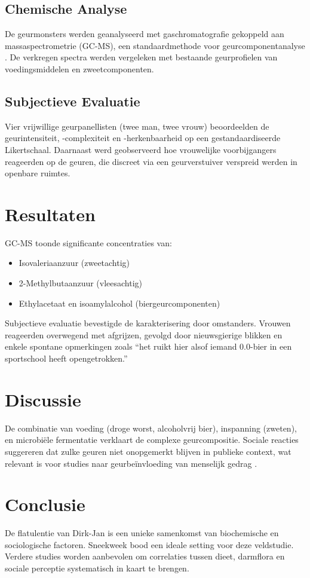 \documentclass{BK5}
\begin{document}
	\subsection{Chemische Analyse}
	De geurmonsters werden geanalyseerd met gaschromatografie gekoppeld aan massaspectrometrie (GC-MS), een standaardmethode voor geurcomponentanalyse \cite{pawliszyn2012handbook}. De verkregen spectra werden vergeleken met bestaande geurprofielen van voedingsmiddelen en zweetcomponenten.
	
	\subsection{Subjectieve Evaluatie}
	Vier vrijwillige geurpanellisten (twee man, twee vrouw) beoordeelden de geurintensiteit, -complexiteit en -herkenbaarheid op een gestandaardiseerde Likertschaal. Daarnaast werd geobserveerd hoe vrouwelijke voorbijgangers reageerden op de geuren, die discreet via een geurverstuiver verspreid werden in openbare ruimtes.
	
	\section{Resultaten}
	GC-MS toonde significante concentraties van:
	\begin{itemize}
		\item Isovaleriaanzuur (zweetachtig)
		\item 2-Methylbutaanzuur (vleesachtig)
		\item Ethylacetaat en isoamylalcohol (biergeurcomponenten)
	\end{itemize}
	
	Subjectieve evaluatie bevestigde de karakterisering door omstanders. Vrouwen reageerden overwegend met afgrijzen, gevolgd door nieuwsgierige blikken en enkele spontane opmerkingen zoals “het ruikt hier alsof iemand 0.0-bier in een sportschool heeft opengetrokken.”
	
	\section{Discussie}
	De combinatie van voeding (droge worst, alcoholvrij bier), inspanning (zweten), en microbiële fermentatie verklaart de complexe geurcompositie. Sociale reacties suggereren dat zulke geuren niet onopgemerkt blijven in publieke context, wat relevant is voor studies naar geurbeïnvloeding van menselijk gedrag \cite{stevenson2010chemosensory}.
	
	\section{Conclusie}
	De flatulentie van Dirk-Jan is een unieke samenkomst van biochemische en sociologische factoren. Sneekweek bood een ideale setting voor deze veldstudie. Verdere studies worden aanbevolen om correlaties tussen dieet, darmflora en sociale perceptie systematisch in kaart te brengen.
	
\end{document}
